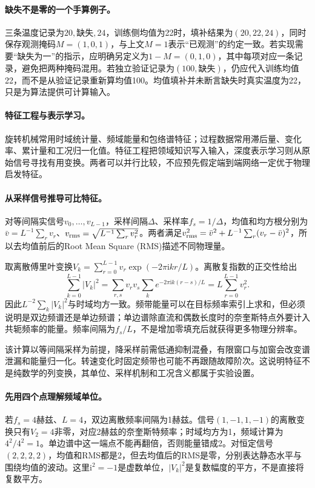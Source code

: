 \paragraph{缺失不是零的一个手算例子。}
三条温度记录为$20,\text{缺失},24$，训练侧均值为22时，填补结果为$(20,22,24)$，同时保存观测掩码$M=(1,0,1)$，与上文$M=1$表示“已观测”的约定一致。若实现需要“缺失为一”的指示，应明确另定义为$1-M=(0,1,0)$，其中每项对应一条记录，避免把两种掩码混用。若独立验证记录为$(100,\text{缺失})$，仍应代入训练均值22，而不是从验证记录重新算均值100。均值填补并未断言缺失时真实温度为22，只是为算法提供可计算输入。

\paragraph{特征工程与表示学习。}
旋转机械常用时域统计量、频域能量和包络谱特征；过程数据常用滞后量、变化率、累计量和工况归一化值。特征工程把领域知识写入输入，深度表示学习则从原始信号寻找有用变换。两者可以并行比较，不应预先假定端到端网络一定优于物理启发特征。

\paragraph{从采样信号推导可比特征。}
对等间隔实信号$v_0,\ldots,v_{L-1}$，采样间隔$\Delta$、采样率$f_s=1/\Delta$，均值和均方根分别为$\bar v=L^{-1}\sum_rv_r$、$v_{\rm rms}=\sqrt{L^{-1}\sum_rv_r^2}$。两者满足$v_{\rm rms}^2=\bar v^2+L^{-1}\sum_r(v_r-\bar v)^2$，所以去均值前后的Root Mean Square (RMS)描述不同物理量。

取离散傅里叶变换$V_k=\sum_{r=0}^{L-1}v_r\exp(-2\pi\mathrm{i}kr/L)$。离散复指数的正交性给出
\begin{equation}
 \sum_{k=0}^{L-1}|V_k|^2
 =\sum_{r,s}v_rv_s\sum_k e^{-2\pi\mathrm{i}k(r-s)/L}
 =L\sum_{r=0}^{L-1}v_r^2.
\end{equation}
因此$L^{-2}\sum_k|V_k|^2$与时域均方一致。频带能量可以在目标频率索引上求和，但必须说明是双边频谱还是单边频谱；单边谱除直流和偶数长度时的奈奎斯特点外要计入共轭频率的能量。频率间隔为$f_s/L$，不是增加零填充后就获得更多物理分辨率。

该计算以等间隔采样为前提，降采样前需低通抑制混叠，有限窗口与加窗会改变谱泄漏和能量归一化。转速变化时固定频带也可能不再跟随故障阶次。这说明特征不是纯数学的列变换，其单位、采样机制和工况含义都属于实验设置。

\paragraph{先用四个点理解频域单位。}
若$f_s=4$赫兹、$L=4$，双边离散频率间隔为1赫兹。信号$(1,-1,1,-1)$的离散变换只有$V_2=4$非零，对应2赫兹的奈奎斯特频率；时域均方为1，频域计算为$4^2/4^2=1$。单边谱中这一端点不能再翻倍，否则能量错成2。对恒定信号$(2,2,2,2)$，均值和RMS都是2，但去均值后的RMS是零，分别表达静态水平与围绕均值的波动。这里$\mathrm{i}^2=-1$是虚数单位，$|V_k|^2$是复数幅度的平方，不是直接将复数平方。

